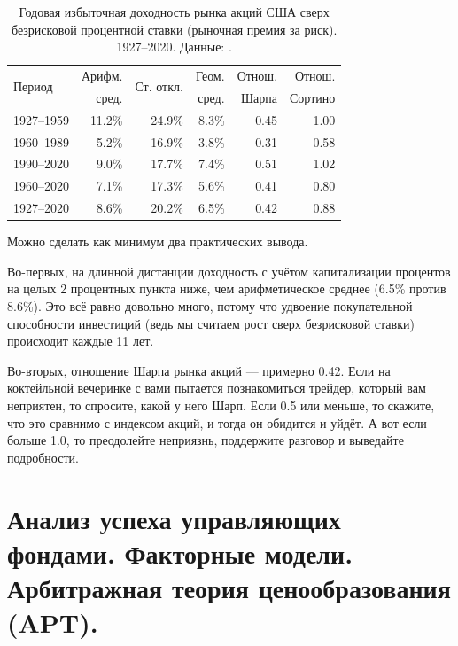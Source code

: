\begin{table}[h]
\centering
\begin{tabular}{l|r|r|r|r|r}
\multirow{2}{*}{Период} &
Арифм. & 
\multirow{2}{*}{Ст. откл.} &
Геом. &
Отнош. &
Отнош. \\
& сред. & & сред. & Шарпа & Сортино \\ 
\hline
1927--1959 & 11.2\% & 24.9\% & 8.3\% & 0.45 & 1.00 \\
1960--1989 &  5.2\% & 16.9\% & 3.8\% & 0.31 & 0.58 \\
1990--2020 &  9.0\% & 17.7\% & 7.4\% & 0.51 & 1.02 \\
1960--2020 &  7.1\% & 17.3\% & 5.6\% & 0.41 & 0.80 \\ \hline
1927--2020 &  8.6\% & 20.2\% & 6.5\% & 0.42 & 0.88 \\
\end{tabular}
\caption{Годовая избыточная доходность рынка акций США сверх безрисковой 
процентной ставки (рыночная премия за риск). 1927--2020. Данные: 
\cite{kennethFrench}.}
\label{us_market_sharpe_ratio}
\end{table}

Можно сделать как минимум два практических вывода.

Во-первых, на длинной дистанции доходность с учётом капитализации процентов
на целых 2 процентных пункта ниже, чем арифметическое среднее (6.5\% против 
8.6\%). Это всё равно довольно много, потому что удвоение покупательной 
способности инвестиций (ведь мы считаем рост сверх безрисковой ставки) 
происходит каждые 11 лет.

Во-вторых, отношение Шарпа рынка акций --- примерно 0.42. Если на коктейльной
вечеринке с вами пытается познакомиться трейдер, который вам неприятен, то 
спросите, какой у него Шарп. Если 0.5 или меньше, то скажите, что это сравнимо с 
индексом акций, и тогда он обидится и уйдёт. А вот если больше 1.0, то 
преодолейте неприязнь, поддержите разговор и выведайте подробности.

\clearpage
\section{Анализ успеха управляющих фондами. Факторные модели. Арбитражная 
теория ценообразования (APT).}

